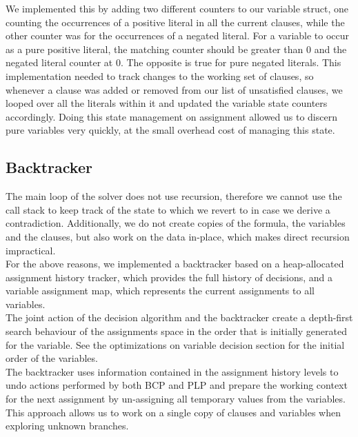 \documentclass[a4paper]{article}
\begin{document}
We implemented this by adding two different counters to our variable struct, one counting the occurrences of a positive literal in all the current clauses, while the other counter was for the occurrences of a negated literal. For a variable to occur as a pure positive literal, the matching counter should be greater than 0 and the negated literal counter at 0. The opposite is true for pure negated literals. This implementation needed to track changes to the working set of clauses, so whenever a clause was added or removed from our list of unsatisfied clauses, we looped over all the literals within it and updated the variable state counters accordingly. Doing this state management on assignment allowed us to discern pure variables very quickly, at the small overhead cost of managing this state.

\subsection{Backtracker}

The main loop of the solver does not use recursion, therefore we cannot use the call stack to keep track of the state to which we revert to in case we derive a contradiction. Additionally, we do not create copies of the formula, the variables and the clauses, but also work on the data in-place, which makes direct recursion impractical.\\

For the above reasons, we implemented a backtracker based on a heap-allocated assignment history tracker, which provides the full history of decisions, and a variable assignment map, which represents the current assignments to all variables.\\

The joint action of the decision algorithm and the backtracker create a depth-first search behaviour of the assignments space in the order that is initially generated for the variable. See the optimizations on variable decision section for the initial order of the variables.\\

The backtracker uses information contained in the assignment history levels to undo actions performed by both BCP and PLP and prepare the working context for the next assignment by un-assigning all temporary values from the variables. This approach allows us to work on a single copy of clauses and variables when exploring unknown branches.\\
\end{document}
